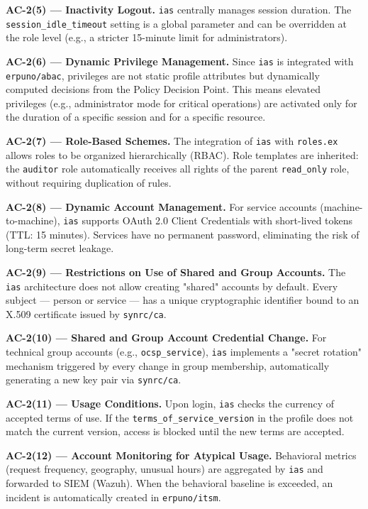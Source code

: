\documentclass{article}
\begin{document}
\textbf{AC-2(5) --- Inactivity Logout.}
\texttt{ias} centrally manages session duration. The \texttt{session\_idle\_timeout} setting is a global parameter and can be overridden at the role level (e.g., a stricter 15-minute limit for administrators).

\textbf{AC-2(6) --- Dynamic Privilege Management.}
Since \texttt{ias} is integrated with \texttt{erpuno/abac}, privileges are not static profile attributes but dynamically computed decisions from the Policy Decision Point. This means elevated privileges (e.g., administrator mode for critical operations) are activated only for the duration of a specific session and for a specific resource.

\textbf{AC-2(7) --- Role-Based Schemes.}
The integration of \texttt{ias} with \texttt{roles.ex} allows roles to be organized hierarchically (RBAC). Role templates are inherited: the \texttt{auditor} role automatically receives all rights of the parent \texttt{read\_only} role, without requiring duplication of rules.

\textbf{AC-2(8) --- Dynamic Account Management.}
For service accounts (machine-to-machine), \texttt{ias} supports OAuth 2.0 Client Credentials with short-lived tokens (TTL: 15 minutes). Services have no permanent password, eliminating the risk of long-term secret leakage.

\textbf{AC-2(9) --- Restrictions on Use of Shared and Group Accounts.}
The \texttt{ias} architecture does not allow creating "shared" accounts by default. Every subject --- person or service --- has a unique cryptographic identifier bound to an X.509 certificate issued by \texttt{synrc/ca}.

\textbf{AC-2(10) --- Shared and Group Account Credential Change.}
For technical group accounts (e.g., \texttt{ocsp\_service}), \texttt{ias} implements a "secret rotation" mechanism triggered by every change in group membership, automatically generating a new key pair via \texttt{synrc/ca}.

\textbf{AC-2(11) --- Usage Conditions.}
Upon login, \texttt{ias} checks the currency of accepted terms of use. If the \texttt{terms\_of\_service\_version} in the profile does not match the current version, access is blocked until the new terms are accepted.

\textbf{AC-2(12) --- Account Monitoring for Atypical Usage.}
Behavioral metrics (request frequency, geography, unusual hours) are aggregated by \texttt{ias} and forwarded to SIEM (Wazuh). When the behavioral baseline is exceeded, an incident is automatically created in \texttt{erpuno/itsm}.
\end{document}
